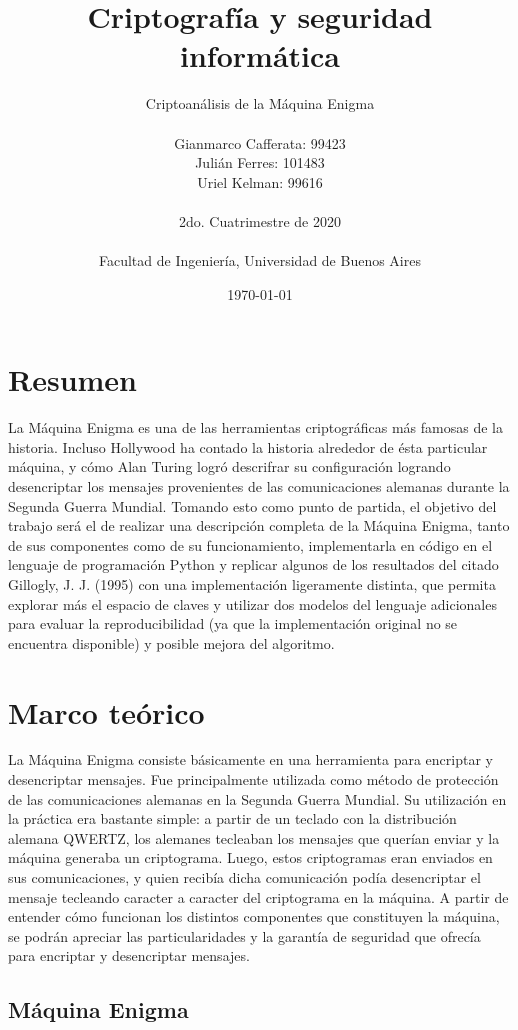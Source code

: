\documentclass[a4paper,10pt]{article}
\title{ \Huge \textbf {Criptografía y seguridad informática}}
\author{
  \Huge Criptoanálisis de la Máquina Enigma\\
  \\
  \LARGE {Gianmarco Cafferata: 99423} \\
  \LARGE {Julián Ferres: 101483} \\
  \LARGE {Uriel Kelman: 99616} \\
  \\
  \LARGE   2do. Cuatrimestre de 2020 \\
  \\
  \LARGE  Facultad de Ingeniería, Universidad de Buenos Aires  \\}
\date{\today}
\begin{document}
  \maketitle
  \thispagestyle{empty}
  \newpage
  \tableofcontents
  \newpage

\section{Resumen}


La Máquina Enigma es una de las herramientas criptográficas más famosas de la historia. Incluso Hollywood ha contado la historia alrededor de ésta particular máquina, y cómo Alan Turing logró descrifrar su configuración logrando desencriptar los mensajes provenientes de las comunicaciones alemanas durante la Segunda Guerra Mundial. Tomando esto como punto de partida, el objetivo del trabajo será el de realizar una descripción completa de la Máquina Enigma, tanto de sus componentes como de su funcionamiento, implementarla en código en el lenguaje de programación Python y replicar algunos de los resultados del citado Gillogly, J. J. (1995)\cite{gillogly} con una implementación ligeramente distinta, que permita explorar más el espacio de claves y utilizar dos modelos del lenguaje adicionales para evaluar la reproducibilidad (ya que la implementación original no se encuentra disponible) y posible mejora del algoritmo.

\section{Marco teórico}

La Máquina Enigma consiste básicamente en una herramienta para encriptar y desencriptar mensajes. Fue principalmente utilizada como método de protección de las comunicaciones alemanas en la Segunda Guerra Mundial. Su utilización en la práctica era bastante simple: a partir de un teclado con la distribución alemana QWERTZ, los alemanes tecleaban los mensajes que querían enviar y la máquina generaba un criptograma. Luego, estos criptogramas eran enviados en sus comunicaciones, y quien recibía dicha comunicación podía desencriptar el mensaje tecleando caracter a caracter del criptograma en la máquina. A partir de entender cómo funcionan los distintos componentes que constituyen la máquina, se podrán apreciar las particularidades y la garantía de seguridad que ofrecía para encriptar y desencriptar mensajes.

\subsection{Máquina Enigma}
\end{document}
